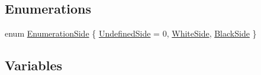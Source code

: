 \subsection*{Enumerations}
\begin{DoxyCompactItemize}
\item 
enum \hyperlink{namespaceChEngn_a680bcca190861d8cee0f8627ce8f9de3}{EnumerationSide} \{ \hyperlink{namespaceChEngn_a680bcca190861d8cee0f8627ce8f9de3a21eec37f5afa6d7b64df3cb2c2098625}{UndefinedSide} =  0, 
\hyperlink{namespaceChEngn_a680bcca190861d8cee0f8627ce8f9de3a1216fa4a94b6a39e924f5965c2f077c8}{WhiteSide}, 
\hyperlink{namespaceChEngn_a680bcca190861d8cee0f8627ce8f9de3a957467874ae046942182f37a5dd95cf1}{BlackSide}
 \}
\end{DoxyCompactItemize}
\subsection*{Variables}
